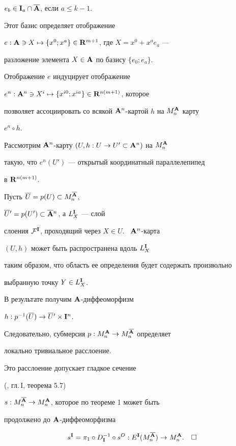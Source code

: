 $e_ b\in {{\bold I}}_a\cap\overline{{\bold A}}$, если $a\le k-1$.


Этот базис определяет отображение


$e:{\bold A}\ni X\mapsto\{x^0;x^a\}\in{\bold R}^{m+1}$, где $X=x^0+x^ae_a$ ---


разложение элемента $X\in {\bold A}$ по базису $\{e_0;e_ a\}$.


Отображение $e$ индуцирует отображение


$e^n:{\bold A}^n\ni X^i\mapsto\{x^{i0};x^{ia}\}\in{\bold R}^{n(m+1)}$, которое


позволяет ассоциировать со всякой ${\bold A}^n$-картой $h$ на $M^{\bold A}_n$ карту


$e^n\circ h$.


 


Рассмотрим ${\bold A}^n$-карту $(U,h:U\to U'\subset{\bold A}^n)$ на $M_n^{\bold A}$


такую, что $e^n(U')$ --- открытый координатный параллелепипед


в ${\bold R}^{n(m+1)}$.


Пусть ${\overline U}=p(U)\subset M_n^{\overline{{\bold A}}}$,


${\overline U}{}'=p(U')\subset{\overline{{\bold A}}}{}^n$, а $L^{\bold I}_X$ --- слой


слоения ${\cal F}^{\bold I}$, проходящий через $X\in U$. \ ${\bold A}^n$-карта


$(U,h)$ может быть распространена вдоль $L^{\bold I}_X$


таким образом, что область ее определения будет содержать произвольно


выбранную точку $Y\in L^{\bold I}_X$.


В результате получим ${\bold A}$-диффеоморфизм


$h:p^{-1}({\overline U})\to {\overline U}{}'\times{\bold I}^n$.


Следовательно, субмерсия $p:M^{\bold A}_n\to M_n^{\overline{{\bold A}}}$ определяет


локально тривиальное расслоение.


Это расслоение допускает гладкое сечение


(\cite{KN}, гл.\,I, теорема 5.7)


$s:M_n^{\overline{{\bold A}}}\to M^{\bold A}_n$, которое по теореме 1 может быть


продолжено до ${\bold A}$-диффеоморфизма


\begin{equation}


s^\I=\pi_1\circ D^{-1}_\I\circ s^O:E^\I(M_n^{\overline\A})\to M^\A_n.


\quad\square


\label{si}


\end{equation}








